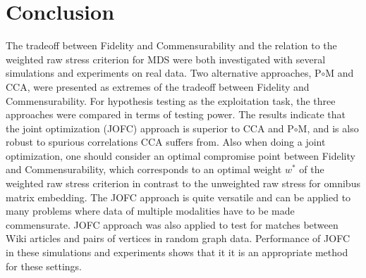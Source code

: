 \documentclass[11pt]{article} %
\begin{document}
\section{Conclusion}
 The tradeoff between Fidelity and Commensurability and the relation to the weighted raw stress criterion for MDS were both investigated with several simulations and experiments on real data.
  Two alternative approaches, P$\circ$M and CCA, were presented as extremes of the tradeoff  between Fidelity and Commensurability.
   For  hypothesis testing as the exploitation task, the three approaches were compared in terms of testing power.
    The results indicate that the joint optimization (JOFC) approach is superior to CCA and  P$\circ$M,
     and is also robust to spurious correlations CCA suffers from.
      Also when doing a joint optimization, one should consider an optimal compromise point between Fidelity and Commensurability,
       which corresponds to an optimal weight $w^*$ of the weighted raw stress criterion in contrast to the unweighted raw stress 
        for omnibus matrix embedding. 
        The JOFC approach is quite versatile and can be applied to many problems where data of multiple modalities have to be made commensurate. 
        JOFC approach was also applied to  test for matches between Wiki articles and pairs of vertices in random graph data.  Performance of JOFC in these simulations and experiments shows that it 
        it is an appropriate method for these settings.  





\end{document}
